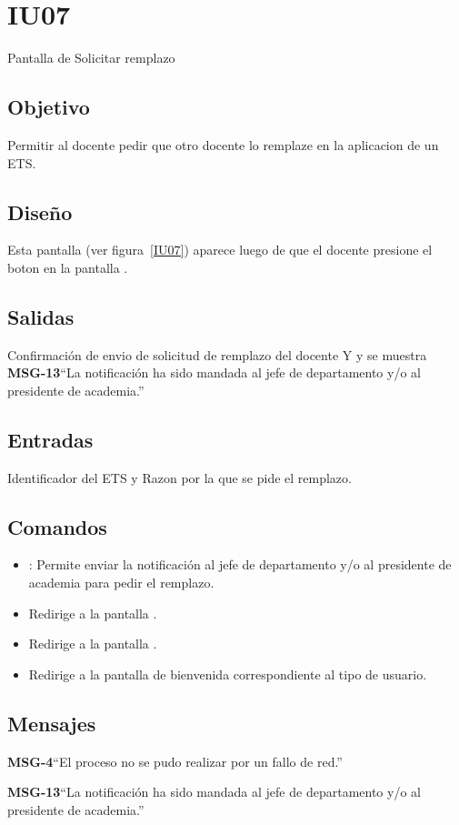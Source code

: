 \section{IU07}{Pantalla de Solicitar remplazo}

\subsection{Objetivo}
Permitir al docente pedir que otro docente lo remplaze en la aplicacion de un ETS.

\subsection{Diseño}
Esta pantalla  (ver figura~\ref{IU07}) aparece luego de que el docente presione el boton  en la pantalla .


\subsection{Salidas}
Confirmación de envio de solicitud de remplazo del docente Y y se muestra {\bf MSG-13}{``La notificación ha sido mandada al jefe de departamento y/o al presidente de academia.''}

\subsection{Entradas}
Identificador del ETS y Razon por la que se pide el remplazo.

\subsection{Comandos}
\begin{itemize}
	\item {}: Permite enviar la notificación al jefe de departamento y/o al presidente de academia para pedir el remplazo.
	\item {} Redirige a la pantalla .
    \item {} Redirige a la pantalla .
    \item {} Redirige a la pantalla de bienvenida correspondiente al tipo de usuario.
\end{itemize}

\subsection{Mensajes}

\begin{Citemize}
	\item {\bf MSG-4}{``El proceso no se pudo realizar por un fallo de red.''}
	\item {\bf MSG-13}{``La notificación ha sido mandada al jefe de departamento y/o al presidente de academia.''}
\end{Citemize}

